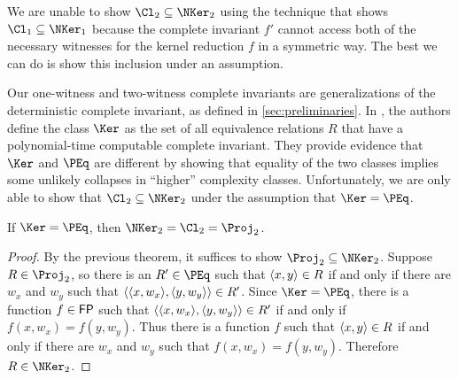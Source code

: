 We are unable to show $\Cl_2 \subseteq \NKer_2$ using the technique that shows $\Cl_1 \subseteq \NKer_1$ because the complete invariant $f'$ cannot access both of the necessary witnesses for the kernel reduction $f$ in a symmetric way.
The best we can do is show this inclusion under an assumption.

Our one-witness and two-witness complete invariants are generalizations of the deterministic complete invariant, as defined in \autoref{sec:preliminaries}.
In \autocite{fg11}, the authors define the class $\Ker$ as the set of all equivalence relations $R$ that have a polynomial-time computable complete invariant.
They provide evidence that $\Ker$ and $\PEq$ are different by showing that equality of the two classes implies some unlikely collapses in ``higher'' complexity classes.
Unfortunately, we are only able to show that $\Cl_2 \subseteq \NKer_2$ under the assumption that $\Ker = \PEq$.

\begin{corollary}
  If $\Ker = \PEq$, then $\NKer_2 = \Cl_2 = \Proj_2$.
\end{corollary}
\begin{proof}
  By the previous theorem, it suffices to show $\Proj_2 \subseteq \NKer_2$.
  Suppose $R \in \Proj_2$, so there is an $R' \in \PEq$ such that $\langle x,y\rangle \in R$ if and only if there are $w_x$ and $w_y$ such that $\langle\langle x,w_x\rangle,\langle y,w_y\rangle\rangle \in R'$.
  Since $\Ker = \PEq$, there is a function $f \in {\ensuremath{\mathsf{FP}}}$ such that $\langle\langle x,w_x\rangle,\langle y,w_y\rangle\rangle \in R'$ if and only if $f(x, w_x) = f(y, w_y)$.
  Thus there is a function $f$ such that $\langle x,y\rangle \in R$ if and only if there are $w_x$ and $w_y$ such that $f(x, w_x) = f(y, w_y)$.
  Therefore $R \in \NKer_2$.
\end{proof}

